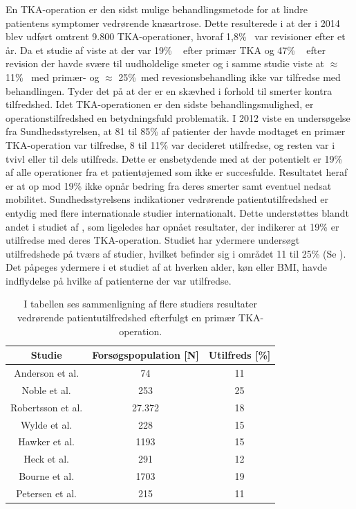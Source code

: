 En TKA-operation er den sidst mulige behandlingsmetode for at lindre patientens symptomer vedrørende knæartrose. Dette resulterede i at der i 2014 blev udført omtrent 9.800 TKA-operationer, hvoraf 1,8\% ~var revisioner efter et år. \citep{aarsrapport2016} Da et studie af \citep{Petersen2015} viste at der var 19\% ~ efter primær TKA og 47\% ~ efter revision der havde svære til uudholdelige smeter og i samme studie viste at $\approx$ 11\%~ med primær- og $\approx$ 25\%~med revesionsbehandling ikke var tilfredse med behandlingen.\citep{Petersen2015} Tyder det på at der er en skævhed i forhold til smerter kontra tilfredshed. Idet TKA-operationen er den sidste behandlingsmulighed, er operationstilfredshed en betydningsfuld problematik. I 2012 viste en undersøgelse fra Sundhedsstyrelsen, at 81 til 85\% af patienter der havde modtaget en primær TKA-operation var tilfredse, 8 til 11\% var decideret utilfredse, og resten var i tvivl eller til dels utilfreds. Dette er ensbetydende med at der potentielt er 19\%~ af alle operationer fra et patientøjemed som ikke er succesfulde. Resultatet heraf er at op mod 19\% ikke opnår bedring fra deres smerter samt eventuel nedsat mobilitet. \citep{brostrom2012} Sundhedsstyrelsens indikationer vedrørende patientutilfredshed er entydig med flere internationale studier internationalt. Dette understøttes blandt andet i studiet af \cite{Bourne2010}, som ligeledes har opnået resultater, der indikerer at 19\% er utilfredse med deres TKA-operation. Studiet har ydermere undersøgt utilfredshede på tværs af studier, hvilket befinder sig i området 11 til 25\% (Se ). \citep{Bourne2010} Det påpeges ydermere i et studiet af \cite{Jacobs2014} at hverken alder, køn eller BMI, havde indflydelse på hvilke af patienterne der var utilfredse. \citep{Jacobs2014}
\begin{table}[H]
	\centering
\begin{tabular}{ccc}
	\hline
	\rowcolor[HTML]{C0C0C0} 
	Studie            & Forsøgspopulation {[}N{]} & Utilfreds {[}\%{]} \\ \hline
	Anderson et al.   & 74                        & 11                 \\
	Noble et al.      & 253                       & 25                 \\
	Robertsson et al. & 27.372                    & 18                 \\
	Wylde et al.      & 228                       & 15                 \\
	Hawker et al.     & 1193                      & 15                 \\
	Heck et al.       & 291                       & 12                 \\
	Bourne et al.     & 1703                      & 19                 \\
	Petersen et al.	  & 215						  & 11				   \\ \hline
\end{tabular}
	\caption{I tabellen ses \cite{Bourne2010} sammenligning af flere studiers resultater vedrørende patientutilfredshed efterfulgt en primær TKA-operation. \citep{Bourne2010}\citep{Petersen2015}}
	\label{tab:patient_utilfreds}
\end{table}

